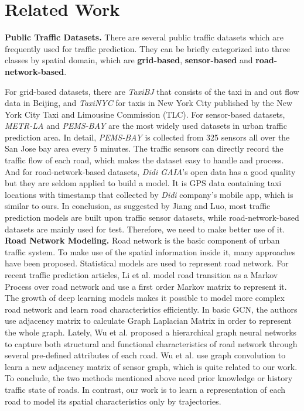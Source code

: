
\section{Related Work}
\textbf{Public Traffic Datasets.} There are several public traffic datasets which are frequently used for traffic prediction. They can be briefly categorized into three classes by spatial domain, which are \textbf{grid-based}, \textbf{sensor-based} and \textbf{road-network-based}.

For grid-based datasets, there are \textit{TaxiBJ}\cite{taxibj} that consists of the taxi in and out flow data in Beijing, and \textit{TaxiNYC} for taxis in New York City published by the New York City Taxi and Limousine Commission (TLC). For sensor-based datasets, \textit{METR-LA}\cite{DCRNN} and \textit{PEMS-BAY} are the most widely used datasets in urban traffic prediction area. In detail, \textit{PEMS-BAY} is collected from 325 sensors all over the San Jose bay area every 5 minutes. The traffic sensors can directly record the traffic flow of each road, which makes the dataset easy to handle and process. And for road-network-based datasets, \textit{Didi GAIA}'s open data has a good quality but they are seldom applied to build a model. It is GPS data containing taxi locations with timestamp that collected by \textit{Didi} company's mobile app, which is similar to ours. In conclusion, as suggested by Jiang and Luo\cite{surveyGNN}, most traffic prediction models are built upon traffic sensor datasets, while road-network-based datasets are mainly used for test. Therefore, we need to make better use of it.
~\\

\textbf{Road Network Modeling.} Road network is the basic component of urban traffic system. To make use of the spatial information inside it, many approaches have been proposed. Statistical models are used to represent road network. For recent traffic prediction articles, Li et al.\cite{TrafficFlowPredictionwithVehicleTrajectories} model road transition as a Markov Process over road network and use a first order Markov matrix to represent it. The growth of deep learning models makes it possible to model more complex road network and learn road characteristics efficiently. In basic GCN\cite{GCN0}, the authors use adjacency matrix to calculate Graph Laplacian Matrix in order to represent the whole graph. Lately, Wu et al.\cite{roadrep} proposed a hierarchical graph neural networks to capture both structural and functional characteristics of road network through several pre-defined attributes of each road. Wu et al.\cite{GWNET} use graph convolution to learn a new adjacency matrix of sensor graph, which is quite related to our work. To conclude, the two methods mentioned above need prior knowledge or history traffic state of roads. In contrast, our work is to learn a representation of each road to model its spatial characteristics only by trajectories.
~\\

